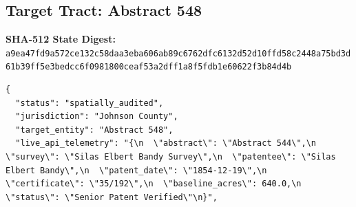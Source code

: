 \documentclass{article}
\begin{document}
\subsection*{Target Tract: Abstract 548}
\textbf{SHA-512 State Digest:}\\
\texttt{a9ea47fd9a572ce132c58daa3eba606ab89c6762dfc6132d52d10ffd58c2448a75bd3d61b39ff5e3bedcc6f0981800ceaf53a2dff1a8f5fdb1e60622f3b84d4b}
\begin{verbatim}
{
  "status": "spatially_audited",
  "jurisdiction": "Johnson County",
  "target_entity": "Abstract 548",
  "live_api_telemetry": "{\n  \"abstract\": \"Abstract 544\",\n  \"survey\": \"Silas Elbert Bandy Survey\",\n  \"patentee\": \"Silas Elbert Bandy\",\n  \"patent_date\": \"1854-12-19\",\n  \"certificate\": \"35/192\",\n  \"baseline_acres\": 640.0,\n  \"status\": \"Senior Patent Verified\"\n}",

\end{verbatim}
\end{document}
